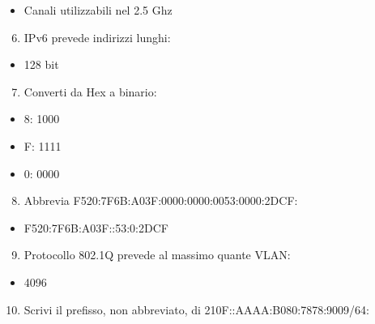 \documentclass[
]{article}
\providecommand{\tightlist}{%
  \setlength{\itemsep}{0pt}\setlength{\parskip}{0pt}}
\begin{document}
\begin{itemize}
\tightlist
\item
  {Canali utilizzabili nel 2.5 Ghz}
\end{itemize}

{}

\begin{enumerate}
\setcounter{enumi}{5}
\tightlist
\item
  {IPv6 prevede indirizzi lunghi:}
\end{enumerate}

\begin{itemize}
\tightlist
\item
  {128 bit}
\end{itemize}

{}

\begin{enumerate}
\setcounter{enumi}{6}
\tightlist
\item
  {Converti da Hex a binario:}
\end{enumerate}

\begin{itemize}
\tightlist
\item
  {8: }{1000}
\item
  {F: }{1111}
\item
  {0: }{0000}
\end{itemize}

{}

\begin{enumerate}
\setcounter{enumi}{7}
\tightlist
\item
  {Abbrevia F520:7F6B:A03F:0000:0000:0053:0000:2DCF:}
\end{enumerate}

\begin{itemize}
\tightlist
\item
  {F520:7F6B:A03F::53:0:2DCF}
\end{itemize}

{}

\begin{enumerate}
\setcounter{enumi}{8}
\tightlist
\item
  {Protocollo 802.1Q prevede al massimo quante VLAN:}
\end{enumerate}

\begin{itemize}
\tightlist
\item
  {4096}
\end{itemize}

{}

\begin{enumerate}
\setcounter{enumi}{9}
\tightlist
\item
  {Scrivi il prefisso, non abbreviato, di 210F::AAAA:B080:7878:9009/64:}
\end{enumerate}
\end{document}
